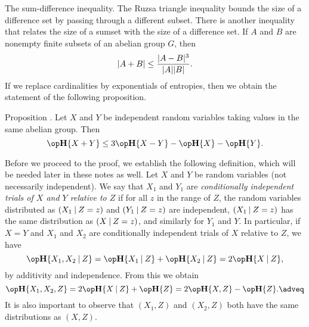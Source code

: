 \medskip\boldlabel The sum-difference inequality.
The Ruzsa triangle inequality bounds the size of a difference set by passing through a different subset. There
is another inequality that relates the size of a sumset with the size of a difference set.
If $A$ and $B$ are nonempty finite subsets of an abelian group $G$, then
$$|A+B| \le {|A-B|^3\over |A||B|}.$$
If we replace cardinalities by exponentials of entropies, then we obtain the statement of the following
proposition.

\proclaim Proposition \advthm.
Let $X$ and $Y$ be independent random variables taking values in the same abelian group. Then
$$\Eta\{X+Y\} \le 3\Eta\{X-Y\} - \Eta\{X\} - \Eta\{Y\}.$$

Before we proceed to the proof, we establish the following definition, which will be needed later in these
notes as well. Let $X$ and $Y$ be random variables (not necessarily independent). We say that
$X_1$ and $Y_1$ are {\it conditionally independent trials of $X$ and $Y$ relative to $Z$} if for all
$z$ in the range
of $Z$, the random variables distributed as $(X_1\mathbin{|} Z=z)$ and $(Y_1\mathbin{|} Z=z)$ are independent,
$(X_1\mathbin{|} Z=z)$ has the same distribution as $(X\mathbin{|} Z=z)$,
and similarly for $Y_1$ and $Y$.
In particular, if $X=Y$ and $X_1$ and $X_2$ are conditionally independent trials of $X$ relative
to $Z$, we have
$$\Eta\{X_1,X_2\given Z\} = \Eta\{X_1\given Z\} + \Eta\{X_2\given Z\} = 2\Eta\{X\given Z\},$$
by additivity and independence. From this we obtain
\edef\eqcondindep{\the\eqcount}
$$\Eta\{X_1,X_2,Z\} = 2\Eta\{X\given Z\} + \Eta\{Z\} = 2\Eta\{X,Z\} - \Eta\{Z\}.\adveq$$
It is also important to observe that $(X_1,Z)$ and $(X_2,Z)$ both have the same distributions
as $(X,Z)$.

